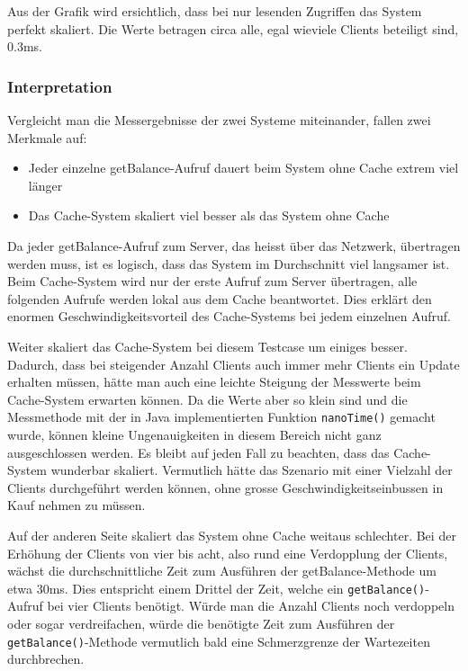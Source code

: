 Aus der Grafik wird ersichtlich, dass bei nur lesenden Zu\-griffen das System perfekt skaliert. Die Werte betragen circa alle, egal wieviele Clients beteiligt sind, 0.3ms. 


\subsubsection{Interpretation}

Vergleicht man die Messergebnisse der zwei Systeme miteinander, fallen zwei Merkmale auf:
\begin{itemize}
\item Jeder einzelne getBalance-Aufruf dauert beim System ohne Cache extrem viel länger
\item Das Cache-System skaliert viel besser als das System ohne Cache
\end{itemize}

Da jeder getBalance-Aufruf zum Server, das heisst über das Netzwerk,
übertragen werden muss, ist es logisch, dass das System im
Durchschnitt viel langsamer ist. Beim Cache-System wird nur der erste
Aufruf zum Server übertragen, alle folgenden Aufrufe werden lokal aus
dem Cache beantwortet. Dies erklärt den enormen
Geschwindigkeitsvorteil des Cache-Systems bei jedem einzelnen Aufruf.

Weiter skaliert das Cache-System bei diesem Testcase um einiges besser. Dadurch, dass bei steigender Anzahl Clients auch immer mehr Clients ein Update erhalten müssen, hätte man auch eine leichte Steigung der Messwerte beim Cache-System erwarten können. Da die Werte aber so klein sind und die Messmethode mit der in Java implementierten Funktion \texttt{nanoTime()} gemacht wurde, können kleine Ungenauigkeiten in diesem Bereich nicht ganz ausgeschlossen werden. Es bleibt auf jeden Fall zu beachten, dass das Cache-System wunderbar skaliert. Vermutlich hätte das Szenario mit einer Vielzahl der Clients durchgeführt werden können, ohne grosse Geschwindigkeitseinbussen in Kauf nehmen zu müssen.

Auf der anderen Seite skaliert das System ohne Cache weitaus schlechter. Bei der Erhöhung der Clients von vier bis acht, also rund eine Verdopplung der Clients, wächst die durchschnittliche Zeit zum Ausführen der getBalance-Methode um etwa 30ms. Dies entspricht einem Drittel der Zeit, welche ein \texttt{getBalance()}-Aufruf bei vier Clients benötigt. Würde man die An\-zahl Cli\-ents noch verdoppeln oder sogar verdreifachen, würde die benötigte Zeit zum Ausführen der \texttt{getBalance()}-Methode vermutlich bald eine Schmerzgrenze der Wartezeiten durchbrechen.

